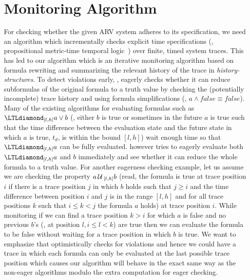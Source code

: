 
\section{Monitoring Algorithm}

For checking whether the given ARV system  adheres to its specification,
we need an algorithm which %
incrementally checks explicit time specifications (\ie, propositional metric-time temporal logic~\cite{Koymans1990})
over finite, timed system traces.
This has led to our algorithm \monitor which is an iterative monitoring algorithm based on formula rewriting and summarizing the relevant history of the trace
in \emph{history-structures}. 
To detect violations early, \monitor, eagerly checks whether it can reduce subformulas of the original formula to a truth value
by checking the (potentially incomplete) trace history and using formula simplifications (\eg, $a\wedge \mathit{false} \equiv \mathit{false}$).
Many of the existing algorithms for evaluating formulas such as $\eventually_{[l,h]} a \vee b$ (\ie, either $b$ is true or sometimes in the future $a$ is true such that the time difference between the evaluation state and the future state in which $a$ is true, $t_d$, is within the bound $[l,h]$) wait enough time so that $\eventually_{[l,h]} a$ can be fully evaluated.
\monitor however tries to eagerly evaluate both $\eventually_{[l,h]} a$ and $b$ immediately and see whether it can reduce the whole formula to a truth value.
For another eagerness checking example,
let us assume we are checking the property $a\,\mathrm{\cal U}\,_{[l, h]}b$ (read, the formula is true at trace position $i$ if there is a trace position
$j$ in which $b$ holds such that $j\geq i$ and the time difference between position $i$ and $j$ is in the range $[l,h]$
and for all trace positions $k$ such that $i\leq k < j$ the formula $a$ holds) at trace position $i$.
While monitoring if we can find a trace position $k > i$ for which $a$ is false and no previous $b$'s (\eg, at position $l, i \leq l < k$) are true then we can evaluate the formula to be false without waiting for a trace position in which $b$ is true. 
We want to emphasize that \monitor optimistically checks for violations and hence we could have a trace in which each formula can only be evaluated at the last possible trace position which causes our algorithm will behave in the exact same way as the non-eager algorithms modulo the extra computation for eager checking.
%

